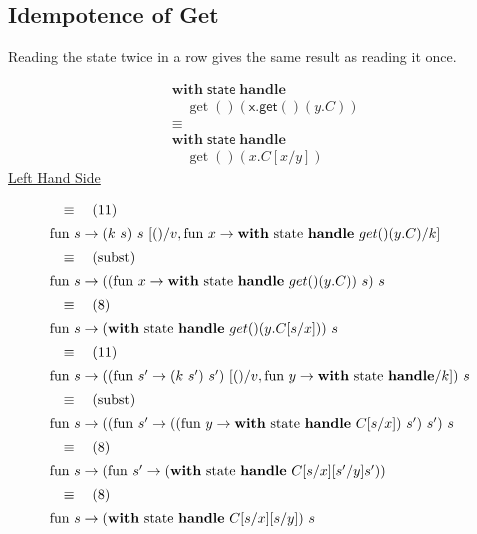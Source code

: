 \documentclass[logo,bsc,singlespacing,parskip]{infthesis}
\begin{document}
\subsection*{Idempotence of Get}
Reading the state twice in a row gives the same result as reading it once.


\[
\begin{aligned}
    &\mathsf{\textbf{with}} \; \mathsf{state} \; \mathsf{\textbf{handle}} \\
    &\quad \operatorname{get}() \left( \mathsf{x.get}() \left( y.C \right) \right) \\
    &\equiv \\
    &\mathsf{\textbf{with}} \; \mathsf{state} \; \mathsf{\textbf{handle}} \\
    &\quad \operatorname{get}() \left( x.C[x/y] \right)
\end{aligned}
\]
\underline{Left Hand Side}

\[ 
\begin{array}{l}
\quad\equiv\quad (11) \\[5pt]
\text{fun } s \rightarrow (k\ s)\ s\ [()/v, \text{fun } x \rightarrow \text{\textbf{with} state \textbf{handle} } get()(y.C)/k] \\[5pt]
\quad\equiv\quad (\text{subst}) \\[5pt]
\text{fun } s \rightarrow ((\text{fun } x \rightarrow \text{\textbf{with} state \textbf{handle} } get()(y.C))\ s)\ s \\[5pt]
\quad\equiv\quad (8) \\[5pt]
\text{fun } s \rightarrow (\text{\textbf{with} state \textbf{handle} } get()(y.C[s/x]))\ s \\[5pt]
\quad\equiv\quad (11) \\[5pt]
\text{fun } s \rightarrow ((\text{fun } s'\rightarrow (k\ s')\ s')\ [()/v, \text{fun } y\rightarrow \text{\textbf{with} state \textbf{handle}}/k])\ s \\[5pt]
\quad\equiv\quad (\text{subst}) \\[5pt]
\text{fun } s \rightarrow ((\text{fun } s' \rightarrow (( \text{fun } y \rightarrow \text{\textbf{with} state \textbf{handle} } C[s/x])\ s')\ s')\ s \\[5pt]
\quad\equiv\quad (8) \\[5pt]
\text{fun } s \rightarrow (\text{fun } s' \rightarrow (\text{\textbf{with} state \textbf{handle} } C[s/x][s'/y]s')) \\[5pt]
\quad\equiv\quad (8) \\[5pt]
\text{fun } s \rightarrow (\text{\textbf{with} state \textbf{handle} } C[s/x][s/y])\ s
\end{array}
\]
\end{document}
